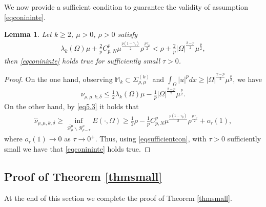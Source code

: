 \documentclass[10pt,a4paper]{article}
\newtheorem{lemma}[theorem]{Lemma}
\theoremstyle{definition} \theoremstyle{remark}
\numberwithin{equation}{section}
\newcommand{\B}{\mathcal{B}}
\newcommand{\la}{\lambda}
\newcommand{\ga}{\gamma}
\begin{document}
We now provide a sufficient condition to guarantee the validity of assumption \eqref{eqconininte}.

\begin{lemma} \label{lemsufficientcon}
	Let $k \geq 2$, $\mu > 0$, $\rho > 0$ satisfy
	\begin{align} \label{eqsufficientcon}
		\la_k(\Omega)\mu + \frac2p C_{p,N}^p \mu^{\frac{p(1-\ga_p)}{2}}\rho ^{\frac{p\ga_p}{2}} < \rho + \frac2p |\Omega|^{\frac{2-p}{2}}\mu^{\frac p2},
	\end{align}
	then \eqref{eqconininte} holds true for sufficiently small $\tau > 0$.
\end{lemma}

\begin{proof}
	On the one hand, observing $\mathbb{M}_k \subset \Sigma_{\rho,\mu}^{(k)}$ and $\int_\Omega|u|^pdx \geq |\Omega|^{\frac{2-p}{2}}\mu^{\frac p2}$, we have
	\begin{align} \label{eqnukleq}
		\nu_{\rho,\mu,k,\delta} \leq \frac12 \la_k(\Omega)\mu - \frac1p |\Omega|^{\frac{2-p}{2}}\mu^{\frac p2}.
	\end{align}
    On the other hand, by \eqref{eq5.3} it holds that
    \begin{align*}
    	\hat \nu_{\rho,\mu,k,\delta} \geq \inf_{\overline{\B_\rho^\mu} \backslash \B_{\rho-\tau}^\mu} E(\cdot,\Omega) \ge \frac12 \rho - \frac1p C_{p,N}^p \mu^{\frac{p(1-\ga_p)}{2}}\rho ^{\frac{p\ga_p}{2}} + o_\tau(1),
    \end{align*}
    where $o_\tau(1) \to 0$ as $\tau \to 0^+$. Thus, using \eqref{eqsufficientcon}, with $\tau > 0$ sufficiently small we have that \eqref{eqconininte} holds true.
\end{proof}

\subsection{Proof of Theorem \ref{thmsmall}}

At the end of this section we complete the proof of Theorem \ref{thmsmall}.
\end{document}
